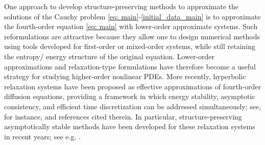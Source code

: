 \documentclass[11pt]{article}
\numberwithin{equation}{section}
\newtheorem{counter example}[theorem]{Counter Example}
\numberwithin{equation}{section}
\numberwithin{equation}{section}
\begin{document}
One approach to develop structure-preserving methods to approximate the solutions of the Cauchy problem \eqref{eq: main}-\eqref{initial_data_main} is to approximate the fourth-order equation \eqref{eq: main} with lower-order approximate systems. Such reformulations are attractive because they allow one to design numerical methods using tools developed for first-order or mixed-order systems, while still retaining the entropy/ energy structure of the original equation. Lower-order approximations and relaxation-type formulations have therefore become a useful strategy for studying higher-order nonlinear PDEs. More recently, hyperbolic relaxation systems have been proposed as effective approximations of fourth-order diffusion equations, providing a framework in which energy stability, asymptotic consistency, and efficient time discretization can be addressed simultaneously; see, for instance, \cite{barthwal2025hyperbolic, barthwal2026energy, dhaouadi2025first,giesselmann2025convergence} and references cited therein. In particular, structure-preserving asymptotically stable methods have been developed for these relaxation systems in recent years; see e.g. \cite{albi2020implicit, boscarino2017unified, ma2025uniform,jin1995relaxation}. 
\end{document}
